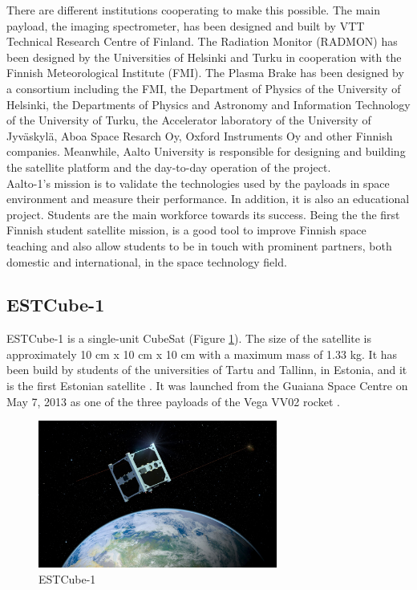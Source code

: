 There are different institutions cooperating to make this possible. The main payload, the imaging spectrometer, has been designed and built by VTT Technical Research Centre of Finland. The Radiation Monitor (RADMON) has been designed by the Universities of Helsinki and Turku in cooperation with the Finnish Meteorological Institute (FMI). The Plasma Brake has been designed by a consortium including the FMI, the Department of Physics of the University of Helsinki, the Departments of Physics and Astronomy and Information Technology of the University of Turku, the Accelerator laboratory of the University of Jyväskylä, Aboa Space Resarch Oy, Oxford Instruments Oy and other Finnish companies. Meanwhile, Aalto University is responsible for designing and building the satellite platform and the day-to-day operation of the project.\cite{AALTO1b}\\
\newpage
Aalto-1's mission is to validate the technologies used by the payloads in space environment and measure their performance. In addition, it is also an educational project. Students are the main workforce towards its success. Being the the first Finnish student satellite mission, is a good tool to improve Finnish space teaching and also allow students to be in touch with prominent partners, both domestic and international, in the space technology field.


\subsection{ESTCube-1}

ESTCube-1 is a single-unit CubeSat (Figure \ref{f1.5}). The size of the satellite is approximately 10 cm x 10 cm x 10 cm with a maximum mass of 1.33 kg. It has been build by students of the universities of Tartu and Tallinn, in Estonia, and it is the first Estonian satellite \cite{ESTCube}.
It was launched from the Guaiana Space Centre on May 7, 2013 as one of the three payloads of the Vega VV02 rocket \cite{Arianespace}.\\

\begin{figure}[H]
\centerline{\includegraphics[width=0.7\textwidth]{images/ESTCube.jpg}}
\caption{ESTCube-1}
\label{f1.5}
\end{figure}

